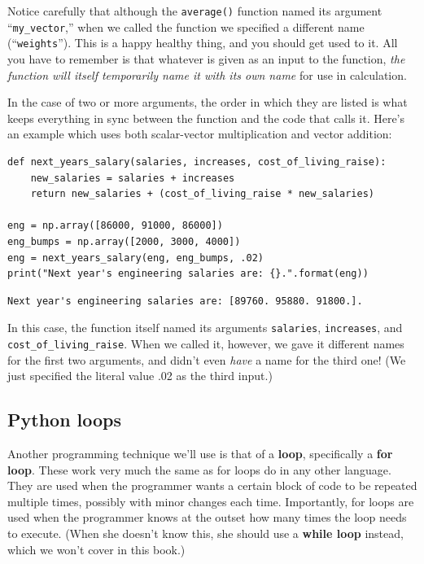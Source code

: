 Notice carefully that although the \texttt{average()} function named its
argument ``\texttt{my\_vector},'' when we called the function we specified a
different name (``\texttt{weights}''). This is a happy healthy thing, and you
should get used to it. All you have to remember is that whatever is given as an
input to the function, \textit{the function will itself temporarily name it
with its own name} for use in calculation.

In the case of two or more arguments, the order in which they are listed is
what keeps everything in sync between the function and the code that calls it.
Here's an example which uses both scalar-vector multiplication and vector
addition:

\begin{Verbatim}[fontsize=\footnotesize,samepage=true,frame=single,framesep=3mm]
def next_years_salary(salaries, increases, cost_of_living_raise):
    new_salaries = salaries + increases
    return new_salaries + (cost_of_living_raise * new_salaries)

eng = np.array([86000, 91000, 86000])
eng_bumps = np.array([2000, 3000, 4000])
eng = next_years_salary(eng, eng_bumps, .02)
print("Next year's engineering salaries are: {}.".format(eng))
\end{Verbatim}
\vspace{-.2in}

\begin{Verbatim}[fontsize=\footnotesize,samepage=true,frame=leftline,framesep=5mm,framerule=1mm]
Next year's engineering salaries are: [89760. 95880. 91800.].
\end{Verbatim}

In this case, the function itself named its arguments \texttt{salaries},
\texttt{increases}, and \texttt{cost\_of\_living\_raise}. When we called it,
however, we gave it different names for the first two arguments, and didn't
even \textit{have} a name for the third one! (We just specified the literal
value .02 as the third input.)

\subsection*{Python loops}


Another programming technique we'll use is that of a \textbf{loop},
specifically a \textbf{for loop}. These work very much the same as for loops do
in any other language. They are used when the programmer wants a certain block
of code to be repeated multiple times, possibly with minor changes each time.
Importantly, for loops are used when the programmer knows at the outset how
many times the loop needs to execute. (When she doesn't know this, she should
use a \textbf{while loop} instead, which we won't cover in this book.)

